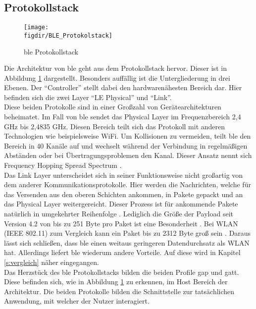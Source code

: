 \subsection{Protokollstack}
\label{ss:funktionsweise:protokollstack}

\begin{figure}[!b]
	\centering
	\texttt{[image: \\figdir/BLE\_Protokolstack]}
	\caption{\ac{ble} Protokollstack \cite[Seite 16]{Townsend14:GSB}}
	\label{FIG:protokollstack}
\end{figure}

\noindent Die Architektur von \ac{ble} geht aus dem Protokollstack hervor. Dieser ist in Abbildung \ref{FIG:protokollstack} dargestellt. Besonders auffällig ist die Untergliederung in drei Ebenen. Der "`Controller"' stellt dabei den hardwarenähesten Bereich dar. Hier befinden sich die zwei Layer "`LE Physical"' und "`Link"'.\\
\noindent Diese beiden Protokolle sind in einer Großzahl von Gerätearchitekturen beheimatet. Im Fall von \ac{ble} sendet das Physical Layer im Frequenzbereich 2,4 GHz bis 2,4835 GHz. Diesen Bereich teilt sich das Protokoll mit anderen Technologien wie beispielsweise WiFi. Um Kollisionen zu vermeiden, teilt \ac{ble} den Bereich in 40 Kanäle auf und wechselt während der Verbindung in regelmäßigen Abständen oder bei Übertragungsproblemen den Kanal. Dieser Ansatz nennt sich Frequency Hopping Spread Spectrum \cite[Seite 16f]{Townsend14:GSB}.\\  
\noindent Das Link Layer unterscheidet sich in seiner Funktionsweise nicht großartig von dem anderer Kommunikationsprotokolle. Hier werden die Nachrichten, welche für das  Versenden aus den oberen Schichten ankommen, in Pakete gepackt und an das Physical Layer weitergereicht. Dieser Prozess ist für ankommende Pakete natürlich in umgekehrter Reihenfolge \cite[Seit 194]{Tanenbaum14:CN}. Lediglich die Größe der Payload seit Version 4.2 von bis zu 251 Byte pro Paket ist eine Besonderheit \cite{Gupta20:WWW}. Bei WLAN (IEEE 802.11) zum Vergleich kann ein Paket bis zu 2312 Byte groß sein \cite[Seite 233]{Gessler15:WNN}. Daraus lässt sich schließen, dass \ac{ble} einen weitaus geringeren Datendurchsatz als WLAN hat. Allerdings liefert \ac{ble} wiederum andere Vorteile. Auf diese wird in Kapitel \ref{s:vergleich} näher eingegangen.\\
\noindent Das Herzstück des \ac{ble} Protokollstacks bilden die beiden Profile \ac{gap} und \ac{gatt}. Diese befinden sich, wie in Abbildung \ref{FIG:protokollstack} zu erkennen, im Host Bereich der Architektur. Die beiden Protokolle bilden die Schnittstelle zur tatsächlichen Anwendung, mit welcher der Nutzer interagiert.\\
